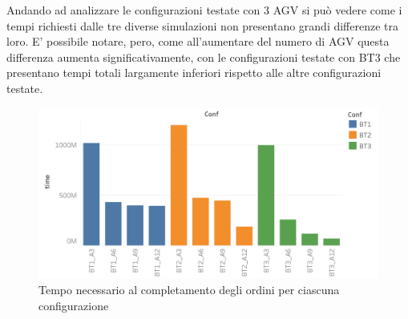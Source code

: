 \documentclass[12pt]{article}
\begin{document}
\noindent Andando ad analizzare le configurazioni testate con 3 AGV si può vedere come i tempi richiesti dalle tre diverse simulazioni non presentano grandi differenze tra loro. E' possibile notare, pero, come all'aumentare del numero di AGV questa differenza aumenta significativamente, con le configurazioni testate con BT3 che presentano tempi totali largamente inferiori rispetto alle altre configurazioni testate.

\begin{figure}[H]
\centering
  \includegraphics[width=1\linewidth]{Figures/Results_Graphics/Time_Total.png}
  \caption{Tempo necessario al completamento degli ordini per ciascuna configurazione}\label{fig:articles_agv_bt1}
\end{figure}

\newpage
\end{document}

